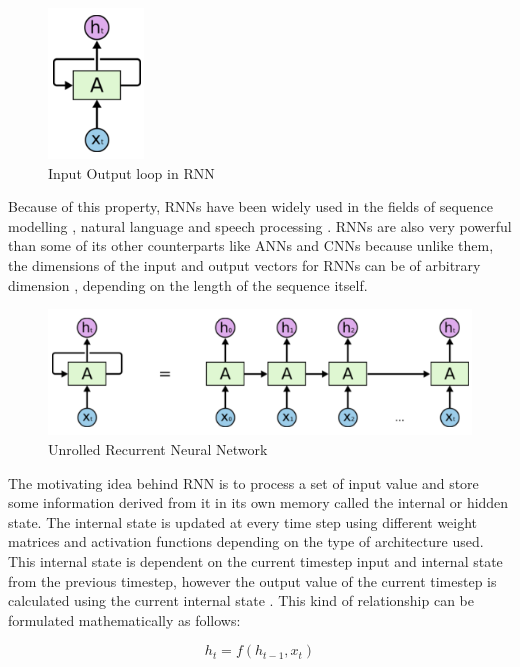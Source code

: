 \documentclass[letterpaper, 10 pt, conference]{ieeeconf}  %
\begin{document}
\begin{figure}[!h]
\centering
\includegraphics[scale=0.7]{../figs/rnn/loop.png}	
\caption{Input Output loop in RNN}
\label{fig:RNN_Loop} 
\end{figure}

Because of this property, RNNs have been widely used in the fields of sequence modelling \cite{gru_evaluation}, natural language and speech processing \cite{google_speech}. RNNs are also very powerful than some of its other counterparts like ANNs and CNNs because unlike them, the dimensions of the input and output vectors for RNNs can be of arbitrary dimension \cite{gru_evaluation}, depending on the length of the sequence itself.

\begin{figure}[!h]
\centering
\includegraphics[scale=0.5]{../figs/rnn/unrolled.png}	
\caption{Unrolled Recurrent Neural Network}
\label{fig:RNN_Unrolled} 
\end{figure}

The motivating idea behind RNN is to process a set of input value and store some information derived from it in its own memory called the internal or hidden state. The internal state is updated at every time step using different weight matrices and activation functions depending on the type of architecture used. This internal state is dependent on the current timestep input and internal state from the previous timestep, however the output value of the current timestep is calculated using the current internal state \cite{gru_translation}. This kind of relationship can be formulated mathematically as follows:

\begin{equation}
h_{t} = f(h_{t-1}, x_t)
\end{equation}
\end{document}
